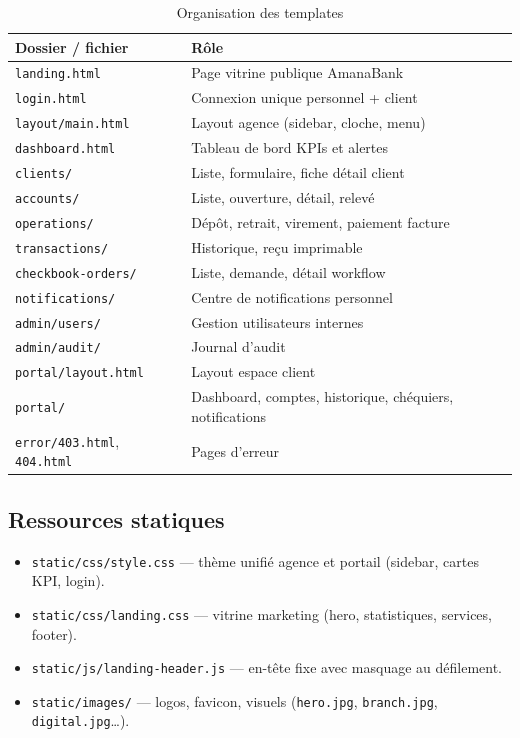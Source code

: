 \begin{table}[H]
    \centering
    \caption{Organisation des templates}
    \label{tab:templates}
    \small
    \begin{tabular}{@{}lp{9cm}@{}}
        \toprule
        \textbf{Dossier / fichier} & \textbf{Rôle} \\
        \midrule
        \texttt{landing.html} & Page vitrine publique AmanaBank \\
        \texttt{login.html} & Connexion unique personnel + client \\
        \texttt{layout/main.html} & Layout agence (sidebar, cloche, menu) \\
        \texttt{dashboard.html} & Tableau de bord KPIs et alertes \\
        \texttt{clients/} & Liste, formulaire, fiche détail client \\
        \texttt{accounts/} & Liste, ouverture, détail, relevé \\
        \texttt{operations/} & Dépôt, retrait, virement, paiement facture \\
        \texttt{transactions/} & Historique, reçu imprimable \\
        \texttt{checkbook-orders/} & Liste, demande, détail workflow \\
        \texttt{notifications/} & Centre de notifications personnel \\
        \texttt{admin/users/} & Gestion utilisateurs internes \\
        \texttt{admin/audit/} & Journal d'audit \\
        \texttt{portal/layout.html} & Layout espace client \\
        \texttt{portal/} & Dashboard, comptes, historique, chéquiers, notifications \\
        \texttt{error/403.html}, \texttt{404.html} & Pages d'erreur \\
        \bottomrule
    \end{tabular}
\end{table}

\subsection{Ressources statiques}

\begin{itemize}[leftmargin=*]
    \item \texttt{static/css/style.css} — thème unifié agence et portail (sidebar, cartes KPI, login).
    \item \texttt{static/css/landing.css} — vitrine marketing (hero, statistiques, services, footer).
    \item \texttt{static/js/landing-header.js} — en-tête fixe avec masquage au défilement.
    \item \texttt{static/images/} — logos, favicon, visuels (\texttt{hero.jpg}, \texttt{branch.jpg}, \texttt{digital.jpg}…).
\end{itemize}

